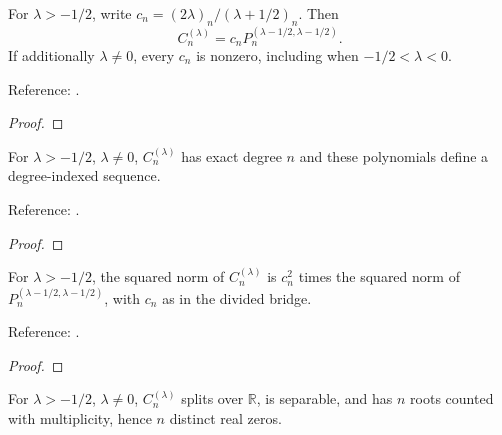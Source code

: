\begin{supporting}
\begin{theorem}
\label{thm:gegenbauer-divided-bridge}
\leanok
For $\lambda>-1/2$, write $c_n=(2\lambda)_n/(\lambda+1/2)_n$. Then
\[C_n^{(\lambda)}=c_nP_n^{(\lambda-1/2,\lambda-1/2)}.\]
If additionally $\lambda\ne0$, every $c_n$ is nonzero, including when
$-1/2<\lambda<0$.

Reference: \cite[18.7.1]{dlmf}.
\end{theorem}
\begin{proof}
\leanok
\end{proof}

\begin{theorem}
\label{thm:gegenbauer-sequence}
\leanok
For $\lambda>-1/2$, $\lambda\ne0$, $C_n^{(\lambda)}$ has exact degree $n$
and these polynomials define a degree-indexed sequence.

Reference: \cite[Table 18.3.1]{dlmf}.
\end{theorem}
\begin{proof}
\leanok
\end{proof}

\begin{theorem}
\label{thm:gegenbauer-norm-transfer}
\leanok
For $\lambda>-1/2$, the squared norm of $C_n^{(\lambda)}$ is $c_n^2$ times
the squared norm of $P_n^{(\lambda-1/2,\lambda-1/2)}$, with $c_n$ as in the
divided bridge.

Reference: \cite[18.7.1]{dlmf}.
\end{theorem}
\begin{proof}
\leanok
\end{proof}

\begin{theorem}
\label{thm:gegenbauer-real-zeros}
\leanok
For $\lambda>-1/2$, $\lambda\ne0$, $C_n^{(\lambda)}$ splits over $\mathbb{R}$,
is separable, and has $n$ roots counted with multiplicity, hence $n$ distinct
real zeros.


\end{theorem}
\end{supporting}
